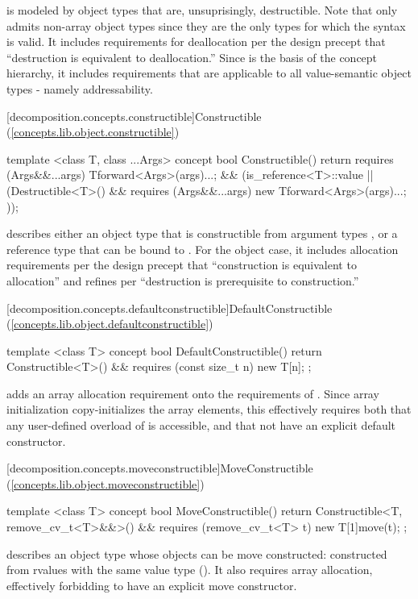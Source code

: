  is modeled by object types that are, unsuprisingly, destructible.  Note
that  only admits non-array object types since they are the only types for which
the syntax  is valid. It includes requirements for deallocation per the design
precept that ``destruction is equivalent to deallocation.'' Since  is the basis
of the concept hierarchy, it includes requirements that are applicable to all value-semantic
object types - namely addressability.

[decomposition.concepts.constructible]{Constructible (\ref{concepts.lib.object.constructible})}
\begin{codeblock}
template <class T, class ...Args>
concept bool Constructible() {
  return requires (Args&&...args) {
    T{forward<Args>(args)...};
  } &&
  (is_reference<T>::value ||
    (Destructible<T>() && requires (Args&&...args) {
      new T{forward<Args>(args)...};
    }));
}
\end{codeblock}

 describes either an object type  that is constructible from argument types
, or a reference type  that can be bound to . For the object case,
it includes allocation requirements per the design precept that ``construction is equivalent to allocation''
and refines  per ``destruction is prerequisite to construction.''

[decomposition.concepts.defaultconstructible]{DefaultConstructible (\ref{concepts.lib.object.defaultconstructible})}
\begin{codeblock}
template <class T>
concept bool DefaultConstructible() {
  return Constructible<T>() &&
    requires (const size_t n) {
      new T[n]{};
    };
}
\end{codeblock}

 adds an array allocation requirement onto the requirements of
. Since array initialization copy-initializes the array elements,
this effectively requires both that any user-defined overload of  is
accessible, and that  not have an explicit default constructor.

[decomposition.concepts.moveconstructible]{MoveConstructible (\ref{concepts.lib.object.moveconstructible})}
\begin{codeblock}
template <class T>
concept bool MoveConstructible() {
  return Constructible<T, remove_cv_t<T>&&>() &&
    requires (remove_cv_t<T> t) {
      new T[1]{move(t)};
    };
}
\end{codeblock}
 describes an object type  whose objects can be move constructed:
constructed from rvalues with the same value type (). It also requires array
allocation, effectively forbidding  to have an explicit move constructor.

